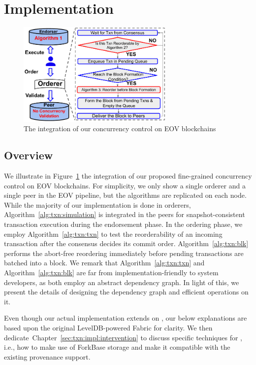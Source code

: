 \section{Implementation}
\label{sec:txn:impl}

\begin{figure}
  \center
	\includegraphics[width=0.68\textwidth]{diagram/txn/fabricX_arch.pdf}
  \caption{The integration of our concurrency control on EOV blockchains}
	\label{diagram:txn:impl:fabricx}
\end{figure}

\subsection{Overview}
We illustrate in Figure~\ref{diagram:txn:impl:fabricx} the integration of our proposed fine-grained concurrency control on EOV blockchains. 
%
For simplicity, we only show a single orderer and a single peer in the EOV pipeline, but the algorithms are replicated on each node. 
%
While the majority of our implementation is done in orderers, Algorithm~\ref{alg:txn:simulation} is integrated in the peers for snapshot-consistent transaction execution during the endorsement phase.
%
In the ordering phase, we employ Algorithm~\ref{alg:txn:txn} to test the reorderability of an incoming transaction after the consensus decides its commit order.
%
Algorithm~\ref{alg:txn:blk} performs the abort-free reordering immediately before pending transactions are batched into a block. 
%
We remark that Algorithm~\ref{alg:txn:txn} and Algorithm~\ref{alg:txn:blk} are far from implementation-friendly to system developers, as both employ an abstract dependency graph.
%
In light of this, we present the details of designing the dependency graph and efficient operations on it.

Even though our actual implementation extends on {\fs}, our below explanations are based upon the original LevelDB-powered Fabric for clarity. 
%
We then dedicate~Chapter~\ref{sec:txn:impl:intervention} to discuss specific techniques for {\fs} , i.e., how to make use of ForkBase storage and make it compatible with the existing provenance support. 

